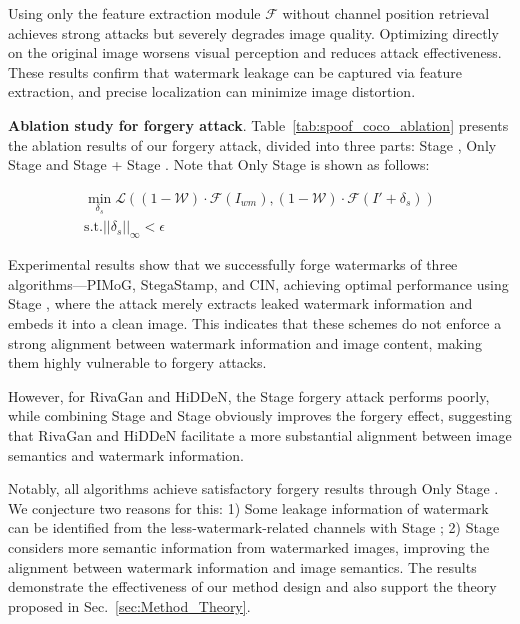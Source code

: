 Using only the feature extraction module $\mathcal{F}$ without channel position retrieval achieves strong attacks but severely degrades image quality. Optimizing directly on the original image worsens visual perception and reduces attack effectiveness. These results confirm that watermark leakage can be captured via feature extraction, and precise localization can minimize image distortion.


\textbf{Ablation study for forgery attack}. Table~\ref{tab:spoof_coco_ablation} presents the ablation results of our forgery attack, divided into three parts: Stage \uppercase\expandafter{}, Only Stage \uppercase\expandafter{} and Stage \uppercase\expandafter{} +  Stage \uppercase\expandafter{}. Note that Only Stage \uppercase\expandafter{} is shown as follows:

\begin{equation}
\label{eq:process-2}
\begin{split}
     \mathop{\min}_{\delta_s}\mathcal{L}((1-\mathcal{W}) \cdot \mathcal{F}(I_{wm}), (1-\mathcal{W})\cdot \mathcal{F}(I' + \delta_s)) \\
    \mathrm{ s.t.} ||\delta_s||_{\infty} < \epsilon
\end{split}
\end{equation}


Experimental results show that we successfully forge watermarks of three algorithms—PIMoG, StegaStamp, and CIN, achieving optimal performance using Stage \uppercase\expandafter{}, where the attack merely extracts leaked watermark information and embeds it into a clean image. This indicates that these schemes do not enforce a strong alignment between watermark information and image content, making them highly vulnerable to forgery attacks.

However, for RivaGan and HiDDeN, the Stage \uppercase\expandafter{} forgery attack performs poorly, while combining Stage \uppercase\expandafter{} and Stage \uppercase\expandafter{} obviously improves the forgery effect, suggesting that RivaGan and HiDDeN facilitate a more substantial alignment between image semantics and watermark information.

Notably, all algorithms achieve satisfactory forgery results through Only Stage \uppercase\expandafter{}. We conjecture two reasons for this: 1) Some leakage information of watermark can be identified from the less-watermark-related channels with Stage \uppercase\expandafter{}; 2) Stage \uppercase\expandafter{} considers more semantic information from watermarked images, improving the alignment between watermark information and image semantics. The results demonstrate the effectiveness of our method design and also support the theory proposed in Sec.~\ref{sec:Method_Theory}.


